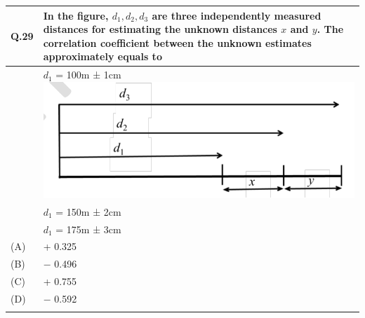 \documentclass[12pt]{article}
\begin{document}
\begin{table}[H]
\renewcommand{\arraystretch}{3}
\setlength{\tabcolsep}{8pt}
\begin{tabular}{|l|p{15cm}|}
\hline


 Q.29 &In the figure, $d_1, d_2, d_3$ are three independently measured distances for estimating
the unknown distances $x$ and $y$. The correlation coefficient between the unknown
estimates approximately equals to \\ \hline
& $d_1$ = 100m ± 1cm \includegraphics[scale = 0.9]{LatexImage4.png} \\
& $d_1$ = 150m ± 2cm \\
& $d_1$ = 175m ± 3cm \\ \hline
(A)&+ 0.325\\ \hline
(B)&$-$ 0.496\\ \hline
(C)&+ 0.755\\ \hline
(D)&$-$ 0.592 \\ \hline
 & \\ \hline


\end{tabular}
\end{table}



\newpage
\end{document}
